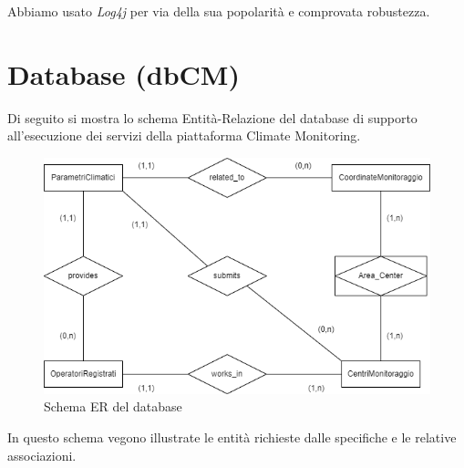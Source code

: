 Abbiamo usato \textsl{Log4j} per via della sua popolarità e comprovata robustezza.

\chapter{Database (dbCM)}
Di seguito si mostra lo schema Entità-Relazione del database di supporto all’esecuzione dei servizi della piattaforma Climate Monitoring.

\begin{figure}[h]
	\centering
	\caption{Schema ER del database}
	\label{fig:erdb}
	\includegraphics[width=0.8\linewidth]{../../fig/img/tecnico/ERdb.drawio}
\end{figure}


In questo schema vegono illustrate le entità richieste dalle specifiche e le relative associazioni.

